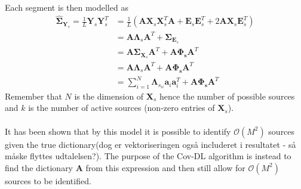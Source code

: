\\
Each segment is then modelled as
\begin{align}\label{eq:cov_model}
\hat{\boldsymbol{\Sigma}}_{\mathbf{Y}_s} = \frac{1}{L}\mathbf{Y}_s \mathbf{Y}_s^T &= \frac{1}{L} \left( \mathbf{A} \mathbf{X}_s \mathbf{X}_s^T \mathbf{A} + \mathbf{E}_s \mathbf{E}_s^T + 2 \mathbf{A} \mathbf{X}_s \mathbf{E}_s^T \right) \nonumber \\
&= \mathbf{A} \boldsymbol{\Lambda}_s \mathbf{A}^T + \boldsymbol{\Sigma}_{\mathbf{E}_s} \nonumber \\
&= \mathbf{A} \boldsymbol{\Sigma}_{\mathbf{X}_s} \mathbf{A}^T + \mathbf{A} \boldsymbol{\Phi_s} \mathbf{A}^T  \nonumber \\
&= \mathbf{A} \boldsymbol{\Lambda}_s \mathbf{A}^T + \mathbf{A} \boldsymbol{\Phi_s} \mathbf{A}^T \nonumber \\
&= \sum_{i=1}^{N} \boldsymbol{\Lambda}_{s_{ii}} \textbf{a}_i\textbf{a}_i^{T} + \mathbf{A} \boldsymbol{\Phi_s} \mathbf{A}^T
\end{align}
Remember that $N$ is the dimension of $\mathbf{X}_s$ hence the number of possible sources and $k$ is the number of active sources (non-zero entries of $\mathbf{X}_s$).
\\ \\
 It has been shown that by this model it is possible to identify $\mathcal{O}(M^2)$ sources given the true dictionary\cite{Pal2015}(dog er vektoriseringen også includeret i resultatet - så måske flyttes udtalelsen?). The purpose of the Cov-DL algorithm is instead to find the dictionary $\textbf{A}$ from this expression and then still allow for $\mathcal{O}(M^2)$ sources to be identified.

